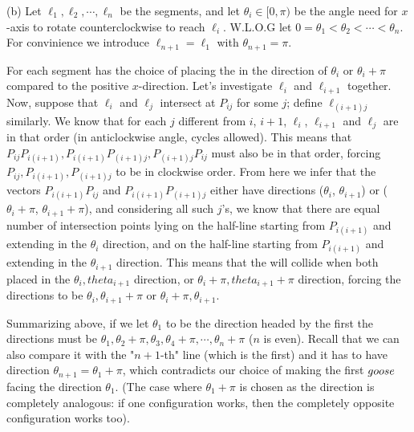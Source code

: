 \documentclass[11pt,a4paper]{article}
\begin{document}
\begin{itemize}
(b) Let $\ell_1, \ell_2, \cdots , \ell_n$ be the segments, and let $\theta_i\in [0, \pi)$ be the angle need for $x$-axis to rotate counterclockwise to reach $\ell_i$. 
W.L.O.G let $0=\theta_1 < \theta_2< \cdots < \theta_n$. For convinience we introduce $\ell_{n+1}=\ell_1$ with $\theta_{n+1}=\pi$. 

For each segment \person has the choice of placing the \animal in the direction of $\theta_i$ or $\theta_i +\pi$ compared to the positive $x$-direction. Let's investigate $\ell_i$ and $\ell_{i+1}$ together. 
Now, suppose that $\ell_i$ and $\ell_j$ intersect at $P_{ij}$ for some $j$; define $\ell_{(i+1)j}$ similarly. 
We know that for each $j$ different from $i$, $i+1$, $\ell_i$, $\ell_{i+1}$ and $\ell_j$ are in that order (in anticlockwise angle, cycles allowed). 
This means that $P_{ij}P_{i(i+1)}, P_{i(i+1)}P_{(i+1)j}, P_{(i+1)j}P_{ij}$ must also be in that order, 
forcing $P_{ij}, P_{i(i+1)}, P_{(i+1)j}$ to be in clockwise order. 
From here we infer that the vectors $P_{i(i+1)}P_{ij}$ and $P_{i(i+1)}P_{(i+1)j}$ either have directions ($\theta_i$, $\theta_{i+1}$) or ($\theta_i +\pi$, $\theta_{i+1} +\pi$), 
and considering all such $j$'s, we know that there are equal number of intersection points lying on the half-line starting from $P_{i(i+1)}$ and extending in the $\theta_i$ direction, and on the half-line starting from $P_{i(i+1)}$ and extending in the $\theta_{i+1}$ direction. 
This means that the \animals will collide when both placed in the $\theta_i, theta_{i+1}$ direction, or $\theta_i +\pi, theta_{i+1}+\pi$ direction, 
forcing the directions to be  $\theta_i, \theta_{i+1}+\pi$ or  $\theta_i +\pi, \theta_{i+1}$. 

Summarizing above, if we let $\theta_1$ to be the direction headed by the first \animal
the directions must be $\theta_1, \theta_2+\pi, \theta_3, \theta_4+\pi, \cdots , \theta_n+\pi$ ($n$ is even). 
Recall that we can also compare it with the "$n+1$-th" line (which is the first) and it has to have direction $\theta_{n+1}=\theta_1 +\pi$, 
which contradicts our choice of making the first $goose$ facing the direction $\theta_1$. 
(The case where $\theta_1+\pi$ is chosen as the direction is completely analogous: if one configuration works, then the completely opposite configuration works too). 
\end{itemize}
\end{document}
